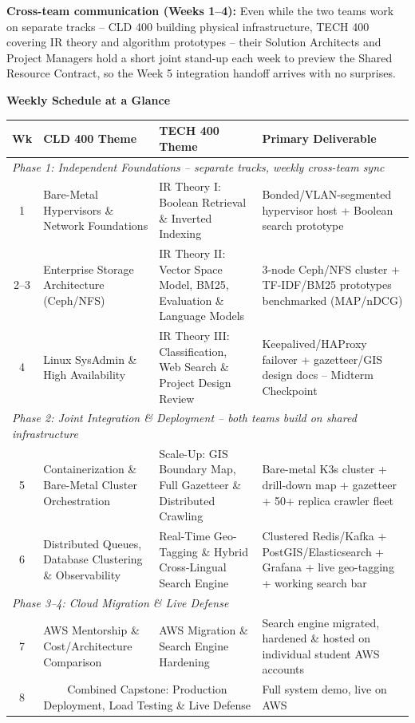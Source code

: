 \documentclass[10pt, a4paper]{article}
\newcommand{\sectionbar}[1]{%
  \par\vspace{0.7em}
  \refstepcounter{section}%
  \noindent\colorbox{secondary}{\parbox{\dimexpr\textwidth-2\fboxsep\relax}{\centering\color{white}\bfseries\Large #1}}%
  \par\vspace{0.5em}
}
\begin{document}
\textbf{Cross-team communication (Weeks 1--4):} Even while the two teams work on separate tracks -- CLD 400 building physical infrastructure, TECH 400 covering IR theory and algorithm prototypes -- their Solution Architects and Project Managers hold a short joint stand-up each week to preview the Shared Resource Contract, so the Week 5 integration handoff arrives with no surprises.

\sectionbar{Weekly Schedule at a Glance}
\begin{table}[H]
\centering
\small
\renewcommand{\arraystretch}{1.3}
\begin{tabularx}{\textwidth}{|c|X|X|X|}
\hline
\rowcolor{lightgray}
\textbf{Wk} & \textbf{CLD 400 Theme} & \textbf{TECH 400 Theme} & \textbf{Primary Deliverable} \\ \hline
\multicolumn{4}{|l|}{\textit{Phase 1: Independent Foundations -- separate tracks, weekly cross-team sync}} \\ \hline
1 & Bare-Metal Hypervisors \& Network Foundations & IR Theory I: Boolean Retrieval \& Inverted Indexing & Bonded/VLAN-segmented hypervisor host + Boolean search prototype \\ \hline
2--3 & Enterprise Storage Architecture (Ceph/NFS) & IR Theory II: Vector Space Model, BM25, Evaluation \& Language Models & 3-node Ceph/NFS cluster + TF-IDF/BM25 prototypes benchmarked (MAP/nDCG) \\ \hline
4 & Linux SysAdmin \& High Availability & IR Theory III: Classification, Web Search \& Project Design Review & Keepalived/HAProxy failover + gazetteer/GIS design docs -- Midterm Checkpoint \\ \hline
\multicolumn{4}{|l|}{\textit{Phase 2: Joint Integration \& Deployment -- both teams build on shared infrastructure}} \\ \hline
5 & Containerization \& Bare-Metal Cluster Orchestration & Scale-Up: GIS Boundary Map, Full Gazetteer \& Distributed Crawling & Bare-metal K3s cluster + drill-down map + gazetteer + 50+ replica crawler fleet \\ \hline
6 & Distributed Queues, Database Clustering \& Observability & Real-Time Geo-Tagging \& Hybrid Cross-Lingual Search Engine & Clustered Redis/Kafka + PostGIS/Elasticsearch + Grafana + live geo-tagging + working search bar \\ \hline
\multicolumn{4}{|l|}{\textit{Phase 3--4: Cloud Migration \& Live Defense}} \\ \hline
7 & AWS Mentorship \& Cost/Architecture Comparison & AWS Migration \& Search Engine Hardening & Search engine migrated, hardened \& hosted on individual student AWS accounts \\ \hline
8 & \multicolumn{2}{c|}{Combined Capstone: Production Deployment, Load Testing \& Live Defense} & Full system demo, live on AWS \\ \hline
\end{tabularx}
\end{table}
\end{document}
